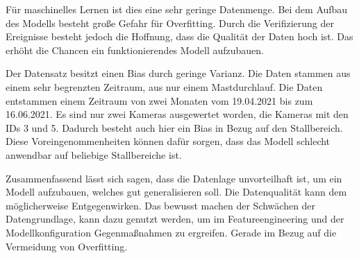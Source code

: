 Für maschinelles Lernen ist dies eine sehr geringe Datenmenge. Bei dem Aufbau des Modells besteht große Gefahr für Overfitting. Durch die Verifizierung der Ereignisse besteht jedoch die Hoffnung, dass die Qualität der Daten hoch ist. Das erhöht die Chancen ein funktionierendes Modell aufzubauen. \par

Der Datensatz besitzt einen Bias durch geringe Varianz. Die Daten stammen aus einem sehr begrenzten Zeitraum, aus nur einem Mastdurchlauf. Die Daten entstammen einem Zeitraum von zwei Monaten vom 19.04.2021 bis zum 16.06.2021. Es sind nur zwei Kameras ausgewertet worden, die Kameras mit den IDs 3 und 5. Dadurch besteht auch hier ein Bias in Bezug auf den Stallbereich. Diese Voreingenommenheiten können dafür sorgen, dass das Modell schlecht anwendbar auf beliebige Stallbereiche ist. \par

Zusammenfassend lässt sich sagen, dass die Datenlage unvorteilhaft ist, um ein Modell aufzubauen, welches gut generalisieren soll. Die Datenqualität kann dem möglicherweise Entgegenwirken. Das bewusst machen der Schwächen der Datengrundlage, kann dazu genutzt werden, um im Featureengineering und der Modellkonfiguration Gegenmaßnahmen zu ergreifen. Gerade im Bezug auf die Vermeidung von Overfitting.
